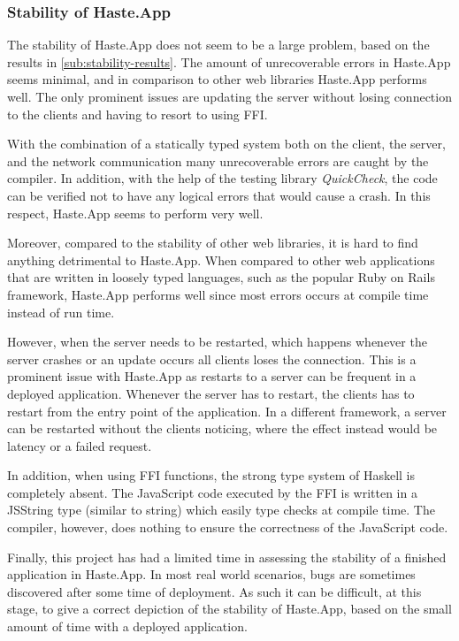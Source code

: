 \documentclass[a4paper]{article}
\begin{document}
\subsubsection{Stability of Haste.App}
The stability of Haste.App does not seem to be a large problem, based on the results in \cref{sub:stability-results}. The amount of unrecoverable errors in Haste.App seems minimal, and in comparison to other web libraries Haste.App performs well. The only prominent issues are updating the server without losing connection to the clients and having to resort to using FFI.

With the combination of a statically typed system both on the client, the server, and the network communication many unrecoverable errors are caught by the compiler. In addition, with the help of the testing library \textit{QuickCheck}, the code can be verified not to have any logical errors that would cause a crash. In this respect, Haste.App seems to perform very well.



Moreover, compared to the stability of other web libraries, it is hard to find anything detrimental to Haste.App. When compared to other web applications that are written in loosely typed languages, such as the popular Ruby on Rails framework, Haste.App performs well since most errors occurs at compile time instead of run time.

However, when the server needs to be restarted, which happens whenever the server crashes or an update occurs all clients loses the connection. This is a prominent issue with Haste.App as restarts to a server can be frequent in a deployed application. Whenever the server has to restart, the clients has to restart from the entry point of the application. In a different framework, a server can be restarted without the clients noticing, where the effect instead would be latency or a failed request.

In addition, when using FFI functions, the strong type system of Haskell is completely absent. The JavaScript code executed by the FFI is written in a JSString type (similar to string) which easily type checks at compile time. The compiler, however, does nothing to ensure the correctness of the JavaScript code. 

Finally, this project has had a limited time in assessing the stability of a finished application in Haste.App. In most real world scenarios, bugs are sometimes discovered after some time of deployment. As such it can be difficult, at this stage, to give a correct depiction of the stability of Haste.App, based on the small amount of time with a deployed application. 
\end{document}

